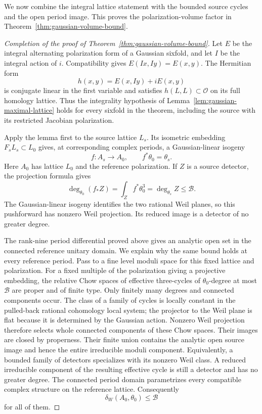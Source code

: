 \documentclass[11pt]{article}
\theoremstyle{definition}
\theoremstyle{remark}
\begin{document}
We now combine the integral lattice statement with the bounded source
cycles and the open period image.  This proves the polarization-volume
factor in Theorem~\ref{thm:gaussian-volume-bound}.

\begin{proof}[Completion of the proof of Theorem~\ref{thm:gaussian-volume-bound}]
Let $E$ be the integral alternating polarization form of a Gaussian
sixfold, and let $I$ be the integral action of $i$.  Compatibility gives
$E(Ix,Iy)=E(x,y)$.  The Hermitian form
\[
 h(x,y)=E(x,Iy)+iE(x,y)
\]
is conjugate linear in the first variable and satisfies
$h(L,L)\subset\mathcal O$ on its full homology lattice.
Thus the integrality hypothesis of
Lemma~\ref{lem:gaussian-maximal-lattice} holds for every sixfold in the
theorem, including the source with its restricted Jacobian polarization.

Apply the lemma first to the source lattice $L_s$.  Its isometric
embedding $F_sL_s\subset L_0$ gives, at corresponding complex periods,
a Gaussian-linear isogeny
\[
 f:A_s\longrightarrow A_0,\qquad f^*\theta_0=\theta_s.
\]
Here $A_0$ has lattice $L_0$ and the reference polarization.  If $Z$
is a source detector, the projection formula gives
\[
 \deg_{\theta_0}(f_*Z)=\int_Zf^*\theta_0^3
                     =\deg_{\theta_s}Z\le\mathcal B.
\]
The Gaussian-linear isogeny identifies the two rational Weil planes,
so this pushforward has nonzero Weil projection.  Its reduced image
is a detector of no greater degree.

The rank-nine period differential proved above gives an analytic open
set in the connected reference unitary domain.  We explain why the
same bound holds at every reference period.  Pass to a fine level
moduli space for this fixed lattice and polarization.  For a fixed
multiple of the polarization giving a projective embedding, the
relative Chow spaces of effective three-cycles of $\theta_0$-degree at most
$\mathcal B$ are proper and of finite type.  Only finitely many degrees
and connected components occur.  The class of a family of cycles is
locally constant in the pulled-back rational cohomology local system;
the projector to the Weil plane is flat because it is determined by
the Gaussian action.  Nonzero Weil projection therefore selects whole
connected components of these Chow spaces.  Their images are closed
by properness.  Their finite union contains the analytic open source
image and hence the entire irreducible moduli component.  Equivalently,
a bounded family of detectors specializes with its nonzero Weil class.
A reduced irreducible component of the resulting effective cycle is
still a detector and has no greater degree.  The connected period
domain parametrizes every compatible complex structure on the
reference lattice.  Consequently
\[
                  \delta_W(A_0,\theta_0)\le\mathcal B
\]
for all of them.


\end{proof}
\end{document}
